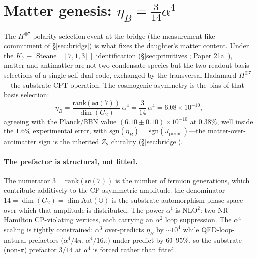 \documentclass[11pt]{article}
\newcommand{\so}{\mathfrak{so}}
\newcommand{\Aut}{\mathrm{Aut}}
\newcommand{\Klogical}{[[7, 1, 3]]}
\newcommand{\sgn}{\mathrm{sgn}}
\begin{document}
\section{Matter genesis: $\eta_B = \tfrac{3}{14}\alpha^4$}
\label{sec:matter}

The $H^{\otimes 7}$ polarity-selection event at the bridge (the measurement-like commitment of \S\ref{sec:bridge}) is what fixes the daughter's matter content. Under the $K_7 \equiv$ Steane $\Klogical$ identification (\S\ref{sec:primitives}; Paper 21a~\cite{Paper21a}), matter and antimatter are not two condensate species but the two readout-basis selections of a single self-dual code, exchanged by the transversal Hadamard $H^{\otimes 7}$---the substrate CPT operation. The cosmogenic asymmetry is the bias of that basis selection:
\[ \eta_B = \frac{\text{rank}(\so(7))}{\dim(G_2)}\,\alpha^4 = \frac{3}{14}\,\alpha^4 = 6.08\times10^{-10}, \]
agreeing with the Planck/BBN value $(6.10 \pm 0.10)\times10^{-10}$ at $0.38\%$, well inside the $1.6\%$ experimental error, with $\sgn(\eta_B) = \sgn(J_{\mathrm{parent}})$---the matter-over-antimatter sign is the inherited $Z_2$ chirality (\S\ref{sec:bridge}).

\paragraph{The prefactor is structural, not fitted.} The numerator $3 = \text{rank}(\so(7))$ is the number of fermion generations, which contribute additively to the CP-asymmetric amplitude; the denominator $14 = \dim(G_2) = \dim\Aut(\mathbb{O})$ is the substrate-automorphism phase space over which that amplitude is distributed. The power $\alpha^4$ is NLO$^2$: two NR-Hamilton CP-violating vertices, each carrying an $\alpha^2$ loop suppression. The $\alpha^4$ scaling is tightly constrained: $\alpha^3$ over-predicts $\eta_B$ by $\sim\!10^4$ while QED-loop-natural prefactors ($\alpha^4/4\pi$, $\alpha^4/16\pi$) under-predict by $60$--$95\%$, so the substrate (non-$\pi$) prefactor $3/14$ at $\alpha^4$ is forced rather than fitted.
\end{document}
